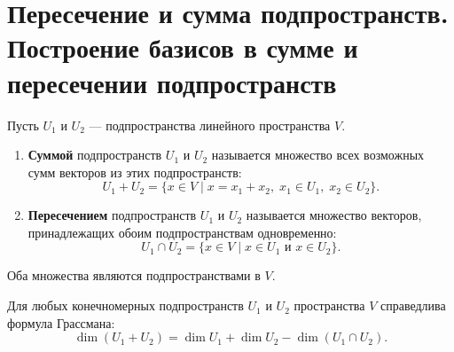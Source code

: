 \section{Пересечение и сумма подпространств. Построение базисов в сумме и пересечении подпространств}

\begin{definition}
Пусть $U_1$ и $U_2$ --- подпространства линейного пространства $V$.
\begin{enumerate}
    \item \textbf{Суммой} подпространств $U_1$ и $U_2$ называется множество всех возможных сумм векторов из этих подпространств:
    \[
    U_1 + U_2 = \{ x \in V \mid x = x_1 + x_2, \; x_1 \in U_1, \; x_2 \in U_2 \}.
    \]
    \item \textbf{Пересечением} подпространств $U_1$ и $U_2$ называется множество векторов, принадлежащих обоим подпространствам одновременно:
    \[
    U_1 \cap U_2 = \{ x \in V \mid x \in U_1 \text{ и } x \in U_2 \}.
    \]
\end{enumerate}
Оба множества являются подпространствами в $V$.
\end{definition}

\begin{theorem}
Для любых конечномерных подпространств $U_1$ и $U_2$ пространства $V$ справедлива формула Грассмана:
\[
\dim(U_1 + U_2) = \dim U_1 + \dim U_2 - \dim(U_1 \cap U_2).
\]
\end{theorem}

